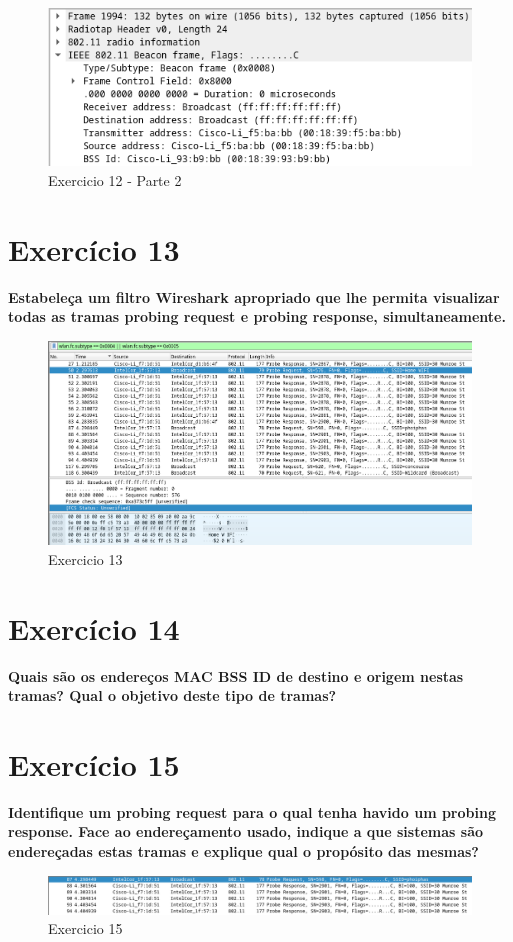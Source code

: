 \documentclass[a4paper]{report}
\begin{document}
\begin{figure}[H]
    \centering 
    \includegraphics[width=\textwidth]{images/ex12p2.png}  
    \caption{Exercicio 12 - Parte 2}
    \label{fig:ex12p2}
\end{figure}

\section{Exercício 13}
\textbf{Estabeleça um filtro Wireshark apropriado que lhe permita visualizar
    todas as tramas probing request e probing response, simultaneamente.}

\begin{figure}[H]
    \centering 
    \includegraphics[width=\textwidth]{images/ex13.png}  
    \caption{Exercicio 13}
    \label{fig:ex13}
\end{figure}

\section{Exercício 14}
\textbf{Quais são os endereços MAC BSS ID de destino e origem nestas tramas?
    Qual o objetivo deste tipo de tramas?}

\section{Exercício 15}
\textbf{Identifique um probing request para o qual tenha havido um probing
    response. Face ao endereçamento usado, indique a que sistemas são
    endereçadas estas tramas e explique qual o propósito das mesmas?}
\begin{figure}[H]
    \centering 
    \includegraphics[width=\textwidth]{images/ex15.png}  
    \caption{Exercicio 15}
    \label{fig:ex15}
\end{figure}
\end{document}
